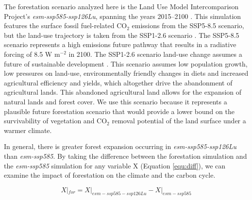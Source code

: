 \documentclass[draft]{agujournal2019}
\begin{document}
The forestation scenario analyzed here is the Land Use Model Intercomparison Project's \textit{esm-ssp585-ssp126Lu}, spanning the years 2015--2100 \cite{lawrence_land_2016}.
This simulation features the surface fossil fuel-related CO$_{2}$ emissions from the SSP5-8.5 scenario, but the land-use trajectory is taken from the SSP1-2.6 scenario \cite{oneill_scenario_2016}.
The SSP5-8.5 scenario represents a high emissions future pathway that results in a radiative forcing of 8.5 W m$^{-2}$ in 2100.
The SSP1-2.6 scenario land-use change assumes a future of sustainable development \cite{van_vuuren_energy_2017}.
This scenario assumes low population growth, low pressures on land-use, environmentally friendly changes in diets and increased agricultural efficiency and yields, which altogether drive the abandonment of agricultural lands.
This abandoned agricultural land allows for the expansion of natural lands and forest cover.
We use this scenario because it represents a plausible future forestation scenario that would provide a lower bound on the survivability of vegetation and CO$_2$ removal potential of the land surface under a warmer climate.

In general, there is greater forest expansion occurring in \textit{esm-ssp585-ssp126Lu} than \textit{esm-ssp585}.
By taking the difference between the forestation simulation and the \textit{esm-ssp585} simulation for any variable X (Equation \ref{equ:diff}), we can examine the impact of forestation on the climate and the carbon cycle.

\begin{linenomath*}
\begin{equation}
    X|_{for} = X|_{esm-ssp585-ssp126Lu} - X|_{esm-ssp585}
    \label{equ:diff}
\end{equation}
\end{linenomath*}
\end{document}
